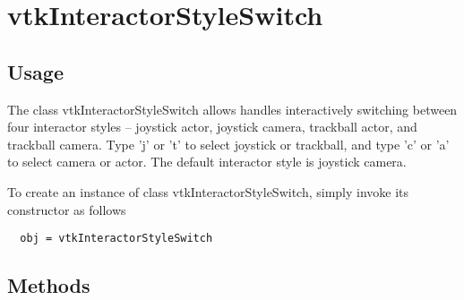 \section{vtkInteractorStyleSwitch}

\subsection{Usage}

 The class vtkInteractorStyleSwitch allows handles interactively switching
 between four interactor styles -- joystick actor, joystick camera,
 trackball actor, and trackball camera.  Type 'j' or 't' to select
 joystick or trackball, and type 'c' or 'a' to select camera or actor.
 The default interactor style is joystick camera.

To create an instance of class vtkInteractorStyleSwitch, simply
invoke its constructor as follows
\begin{verbatim}
  obj = vtkInteractorStyleSwitch
\end{verbatim}
\subsection{Methods}

